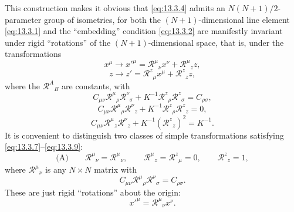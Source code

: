 This construction makes it obvious that \eqref{eq:13.3.4} admits an
\(N(N+1)/2\)-parameter group of isometries, for both the
\((N+1)\)-dimensional line element \eqref{eq:13.3.1} and the ``embedding''
condition \eqref{eq:13.3.2} are manifestly invariant under rigid
``rotations'' of the \((N+1)\)-dimensional space, that is, under the
transformations
\begin{equation}
  x^\mu\longrightarrow x'^\mu
  =
  \mathcal R^\mu{}_\nu x^\nu+\mathcal R^\mu{}_{z}z,
  \tag{13.3.5}\label{eq:13.3.5}
\end{equation}
\begin{equation}
  z\longrightarrow z'
  =
  \mathcal R^{z}{}_\mu x^\mu+\mathcal R^{z}{}_{z}z,
  \tag{13.3.6}\label{eq:13.3.6}
\end{equation}
where the \(\mathcal R^A{}_B\) are constants, with
\begin{equation}
  C_{\mu\nu}
  \mathcal R^\mu{}_\rho\mathcal R^\nu{}_\sigma
  +K^{-1}\mathcal R^{z}{}_\rho\mathcal R^{z}{}_\sigma
  =
  C_{\rho\sigma},
  \tag{13.3.7}\label{eq:13.3.7}
\end{equation}
\begin{equation}
  C_{\mu\nu}
  \mathcal R^\mu{}_\rho\mathcal R^\nu{}_{z}
  +K^{-1}\mathcal R^{z}{}_\rho\mathcal R^{z}{}_{z}
  =
  0,
  \tag{13.3.8}\label{eq:13.3.8}
\end{equation}
\begin{equation}
  C_{\mu\nu}
  \mathcal R^\mu{}_{z}\mathcal R^\nu{}_{z}
  +K^{-1}\left(\mathcal R^{z}{}_{z}\right)^2
  =
  K^{-1}.
  \tag{13.3.9}\label{eq:13.3.9}
\end{equation}
It is convenient to distinguish two classes of simple transformations
satisfying \eqref{eq:13.3.7}--\eqref{eq:13.3.9}:
\begin{equation}
  \text{(A)}
  \qquad
  \mathcal R^\mu{}_\nu=\mathscr R^\mu{}_\nu,
  \qquad
  \mathcal R^\mu{}_{z}=\mathcal R^{z}{}_\mu=0,
  \qquad
  \mathcal R^{z}{}_{z}=1,
  \tag{13.3.10}\label{eq:13.3.10}
\end{equation}
where \(\mathscr R^\mu{}_\nu\) is any \(N\times N\) matrix with
\begin{equation}
  C_{\mu\nu}
  \mathscr R^\mu{}_\rho\mathscr R^\nu{}_\sigma
  =
  C_{\rho\sigma}.
  \tag{13.3.11}\label{eq:13.3.11}
\end{equation}
These are just rigid ``rotations'' about the origin:
\begin{equation}
  x'^\mu=\mathscr R^\mu{}_\nu x^\nu.
  \tag{13.3.12}\label{eq:13.3.12}
\end{equation}
